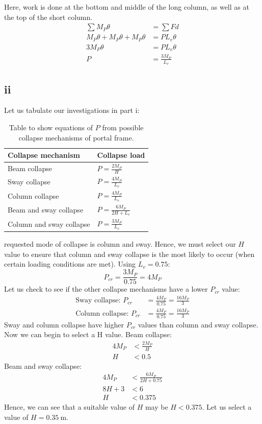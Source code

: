 \documentclass[11pt]{article}
\numberwithin{equation}{section}
\begin{document}
Here, work is done at the bottom and middle of the long column, as well as at the top of the short column.
\begin{align}
    \sum M_P\theta &= \sum Fd\\
    M_P\theta + M_P\theta + M_P\theta &= PL_v\theta\\
    3M_P\theta &= PL_v\theta\\
    P &= \frac{3M_P}{L_v}
\end{align}
\subsection{ii}
Let us tabulate our investigations in part i:
\begin{table}[H]
    \centering
    \begin{tabular}{ll}
        \toprule
        Collapse mechanism & Collapse load\\
        \midrule
        Beam collapse & $P = \frac{2M_P}{H}$\\
        Sway collapse & $P = \frac{4M_P}{L_v}$\\
        Column collapse & $P = \frac{4M_P}{L_v}$\\
        Beam and sway collapse & $P = \frac{6M_P}{2H + L_v}$\\
        Column and sway collapse & $P = \frac{3M_P}{L_v}$\\
        \bottomrule
    \end{tabular}
    \caption{Table to show equations of $P$ from possible collapse mechanisms of portal frame.}
    \label{tab:collapses}
\end{table} requested mode of collapse is column and sway. Hence, we must select our $H$ value to ensure that column and sway collapse is the most likely to occur (when certain loading conditions are met). Using $L_v = 0.75$:
\begin{equation}
    P_{cr} = \frac{3M_P}{0.75} = 4 M_P
\end{equation}
Let us check to see if the other collapse mechanisms have a lower $P_{cr}$ value:
\begin{align}
    \textrm{Sway collapse: } P_{cr} &= \frac{4M_P}{0.75} = \frac{16M_P}{3}\\
    \textrm{Column collapse: } P_{cr} &= \frac{4M_P}{0.75} = \frac{16M_P}{3} 
\end{align}
Sway and column collapse have higher $P_{cr}$ values than column and sway collapse. Now we can begin to select a H value. Beam collapse:
\begin{align}
    4M_P &< \frac{2M_P}{H}\\
    H &< 0.5
\end{align}
Beam and sway collapse:
\begin{align}
    4M_P &< \frac{6M_P}{2H + 0.75}\\
    8H + 3 &< 6\\
    H &< 0.375
\end{align}
Hence, we can see that a suitable value of $H$ may be $H < 0.375$. Let us select a value of $H = \SI{0.35}{\meter}$.
\end{document}
